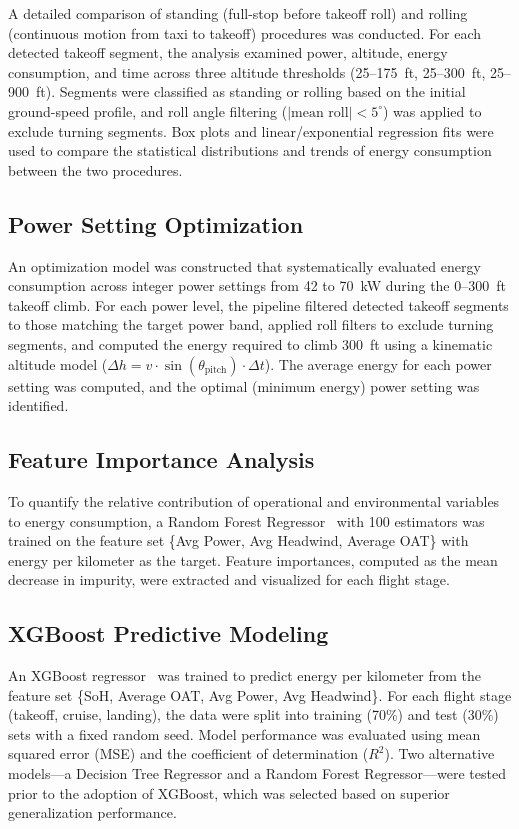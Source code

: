 \documentclass[11pt,a4paper]{article}
\begin{document}
A detailed comparison of standing (full-stop before takeoff roll) and rolling (continuous motion from taxi to takeoff) procedures was conducted.
For each detected takeoff segment, the analysis examined power, altitude, energy consumption, and time across three altitude thresholds (25--175~ft, 25--300~ft, 25--900~ft).
Segments were classified as standing or rolling based on the initial ground-speed profile, and roll angle filtering ($|\text{mean roll}| < 5^\circ$) was applied to exclude turning segments.
Box plots and linear/exponential regression fits were used to compare the statistical distributions and trends of energy consumption between the two procedures.

\subsection{Power Setting Optimization}

An optimization model was constructed that systematically evaluated energy consumption across integer power settings from 42 to 70~kW during the 0--300~ft takeoff climb.
For each power level, the pipeline filtered detected takeoff segments to those matching the target power band, applied roll filters to exclude turning segments, and computed the energy required to climb 300~ft using a kinematic altitude model ($\Delta h = v \cdot \sin(\theta_{\mathrm{pitch}}) \cdot \Delta t$).
The average energy for each power setting was computed, and the optimal (minimum energy) power setting was identified.

\subsection{Feature Importance Analysis}

To quantify the relative contribution of operational and environmental variables to energy consumption, a Random Forest Regressor~\cite{breiman2001} with 100 estimators was trained on the feature set \{Avg Power, Avg Headwind, Average OAT\} with energy per kilometer as the target.
Feature importances, computed as the mean decrease in impurity, were extracted and visualized for each flight stage.

\subsection{XGBoost Predictive Modeling}

An XGBoost regressor~\cite{chen2016} was trained to predict energy per kilometer from the feature set \{SoH, Average OAT, Avg Power, Avg Headwind\}.
For each flight stage (takeoff, cruise, landing), the data were split into training (70\%) and test (30\%) sets with a fixed random seed.
Model performance was evaluated using mean squared error (MSE) and the coefficient of determination ($R^2$).
Two alternative models---a Decision Tree Regressor and a Random Forest Regressor---were tested prior to the adoption of XGBoost, which was selected based on superior generalization performance.
\end{document}
